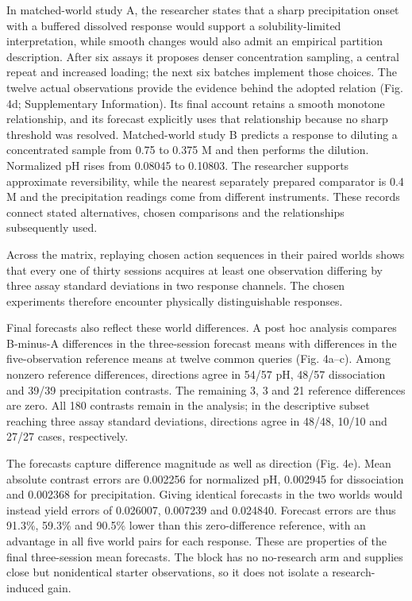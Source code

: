 \documentclass[10pt,a4paper]{article}
\begin{document}
In matched-world study A, the researcher states that a sharp precipitation onset with a buffered dissolved response would support a solubility-limited interpretation, while smooth changes would also admit an empirical partition description. After six assays it proposes denser concentration sampling, a central repeat and increased loading; the next six batches implement those choices. The twelve actual observations provide the evidence behind the adopted relation (Fig. 4d; Supplementary Information). Its final account retains a smooth monotone relationship, and its forecast explicitly uses that relationship because no sharp threshold was resolved. Matched-world study B predicts a response to diluting a concentrated sample from 0.75 to 0.375 M and then performs the dilution. Normalized pH rises from 0.08045 to 0.10803. The researcher supports approximate reversibility, while the nearest separately prepared comparator is 0.4 M and the precipitation readings come from different instruments. These records connect stated alternatives, chosen comparisons and the relationships subsequently used.

Across the matrix, replaying chosen action sequences in their paired worlds shows that every one of thirty sessions acquires at least one observation differing by three assay standard deviations in two response channels. The chosen experiments therefore encounter physically distinguishable responses.

Final forecasts also reflect these world differences. A post hoc analysis compares B-minus-A differences in the three-session forecast means with differences in the five-observation reference means at twelve common queries (Fig. 4a--c). Among nonzero reference differences, directions agree in 54/57 pH, 48/57 dissociation and 39/39 precipitation contrasts. The remaining 3, 3 and 21 reference differences are zero. All 180 contrasts remain in the analysis; in the descriptive subset reaching three assay standard deviations, directions agree in 48/48, 10/10 and 27/27 cases, respectively.

The forecasts capture difference magnitude as well as direction (Fig. 4e). Mean absolute contrast errors are 0.002256 for normalized pH, 0.002945 for dissociation and 0.002368 for precipitation. Giving identical forecasts in the two worlds would instead yield errors of 0.026007, 0.007239 and 0.024840. Forecast errors are thus 91.3\%, 59.3\% and 90.5\% lower than this zero-difference reference, with an advantage in all five world pairs for each response. These are properties of the final three-session mean forecasts. The block has no no-research arm and supplies close but nonidentical starter observations, so it does not isolate a research-induced gain.
\end{document}

